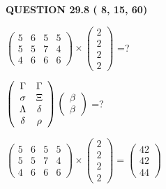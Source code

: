 \documentclass[12pt]{article}
\begin{document}
{\textbf{\Large{QUESTION
29.8 
 (          8,         15,         60)
}}}
  
  
 
$ \left( \begin{array}{ccccccccc}
           5 & 
           6 & 
           5 & 
           5 \\ 
           5 & 
           5 & 
           7 & 
           4 \\ 
           4 & 
           6 & 
           6 & 
           6
\end{array}\right) \times
\left( \begin{array}{c}
           2 \\ 
           2 \\ 
           2 \\ 
           2
\end{array}\right) $ =?
 
 
$  %
 \left( \begin{array}
 {
 c
 c
 }
 \Gamma & 
 \Gamma \\ 
 \sigma & 
                    \Xi \\ 
 \Lambda & 
 \delta \\ 
 \delta & 
 \rho
 \end{array} \right)
 \left( \begin{array}
 {
 c
 }
 \beta \\ 
 \beta
 \end{array} \right)
$ =?
 
 
 
\noindent{}
 
 

 
$\left( \begin{array}{ccccccccccccccc}
           5 & 
           6 & 
           5 & 
           5 \\ 
           5 & 
           5 & 
           7 & 
           4 \\ 
           4 & 
           6 & 
           6 & 
           6
\end{array}\right) \times
\left( \begin{array}{c}
           2 \\ 
           2 \\ 
           2 \\ 
           2
\end{array}\right)  =
\left( \begin{array}{c}
          42 \\ 
          42 \\ 
          44
\end{array}\right)  $
 
\end{document}
